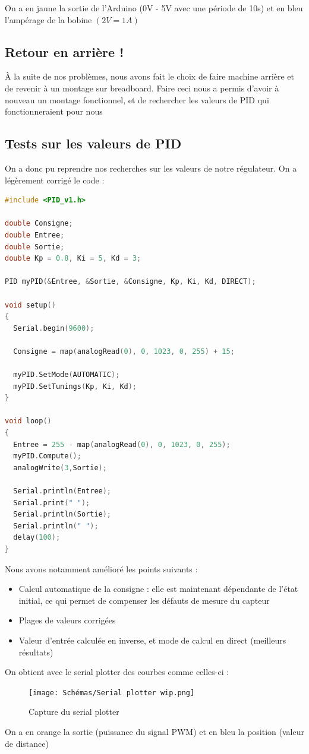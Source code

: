 \documentclass[11pt,a4paper]{article}
\begin{document}
On a en jaune la sortie de l'Arduino (0V - 5V avec une période de 10s) et en bleu l'ampérage de la bobine $(2V = 1A)$

\subsection{Retour en arrière !}
À la suite de nos problèmes, nous avons fait le choix de faire machine arrière et de revenir à un montage sur breadboard. Faire ceci nous a permis d'avoir à nouveau un montage fonctionnel, et de rechercher les valeurs de PID qui fonctionneraient pour nous

\subsection{Tests sur les valeurs de PID}
On a donc pu reprendre nos recherches sur les valeurs de notre régulateur. On a légèrement corrigé le code :
\begin{lstlisting}[language = C]
#include <PID_v1.h>

double Consigne;
double Entree;
double Sortie;
double Kp = 0.8, Ki = 5, Kd = 3;

PID myPID(&Entree, &Sortie, &Consigne, Kp, Ki, Kd, DIRECT);

void setup()
{
  Serial.begin(9600);

  Consigne = map(analogRead(0), 0, 1023, 0, 255) + 15;

  myPID.SetMode(AUTOMATIC);
  myPID.SetTunings(Kp, Ki, Kd);  
}

void loop()
{
  Entree = 255 - map(analogRead(0), 0, 1023, 0, 255);
  myPID.Compute();
  analogWrite(3,Sortie);

  Serial.println(Entree);
  Serial.print(" ");
  Serial.println(Sortie);
  Serial.println(" ");
  delay(100);
}
\end{lstlisting}

Nous avons notamment amélioré les points suivants :
\begin{itemize}
\item Calcul automatique de la consigne : elle est maintenant dépendante de l'état initial, ce qui permet de compenser les défauts de mesure du capteur
\item Plages de valeurs corrigées
\item Valeur d'entrée calculée en inverse, et mode de calcul en direct (meilleurs résultats)
\end{itemize}

On obtient avec le serial plotter des courbes comme celles-ci :
\begin{figure} [H]
\begin{center}
\texttt{[image: Schémas/Serial plotter wip.png]} 
\end{center}
\caption{Capture du serial plotter}
\end{figure}
On a en orange la sortie (puissance du signal PWM) et en bleu la position (valeur de distance)\\
\end{document}

